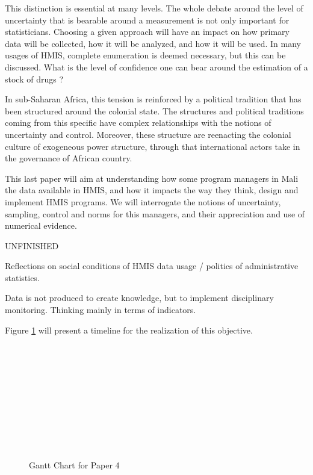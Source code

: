 This distinction is essential at many levels. The whole debate around the level of uncertainty that is bearable around a measurement is not only important for statisticians. Choosing a given approach will have an impact on how primary data will be collected, how it will be analyzed, and how it will be used. In many usages of HMIS, complete enumeration is deemed necessary, but this can be discussed. What is the level of confidence one can bear around the estimation of a stock of drugs ?

In sub-Saharan Africa, this tension is reinforced by a political tradition that has been structured around the colonial state. The structures and political traditions coming from this specific have complex relationships with the notions of uncertainty and control. Moreover, these structure are reenacting the colonial culture of exogeneous power structure, through that international actors take in the governance of African country.

This last paper will aim at understanding how some program managers in Mali the data available in HMIS, and how it impacts the way they think, design and implement HMIS programs. We will interrogate the notions of uncertainty, sampling, control and norms for this managers, and their appreciation and use of numerical evidence.

UNFINISHED

Reflections on social conditions of HMIS data usage  / politics of administrative statistics.

Data is not produced to create knowledge, but to implement disciplinary monitoring. Thinking mainly in terms of indicators.


    Figure \ref{Gantt4} will present a timeline for the realization of this objective.

    \begin{figure}[h]
    \begin{ganttchart}{1}{24}
     \\
     \\
     \\
     \\
     \\
     \\
     \\
     \\
     \\
    \end{ganttchart}
    \caption{Gantt Chart for Paper 4}
    \label{Gantt4}
    \end{figure}
